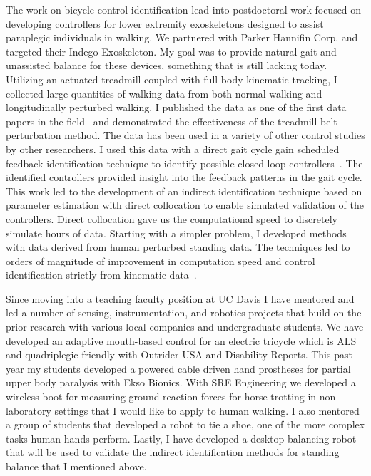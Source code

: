 \documentclass{article}
\begin{document}
The work on bicycle control identification lead into postdoctoral work focused
on developing controllers for lower extremity exoskeletons designed to assist
paraplegic individuals in walking. We partnered with Parker Hannifin Corp. and
targeted their Indego Exoskeleton. My goal was to provide natural gait and
unassisted balance for these devices, something that is still lacking today.
Utilizing an actuated treadmill coupled with full body kinematic tracking, I
collected large quantities of walking data from both normal walking and
longitudinally perturbed walking. I published the data as one of the first data
papers in the field~\cite{Moore2015b} and demonstrated the effectiveness of the
treadmill belt perturbation method. The data has been used in a variety of
other control studies by other researchers. I used this data with a direct gait
cycle gain scheduled feedback identification technique to identify possible
closed loop controllers~\cite{Moore2013c,Moore2014a,Moore2014c}. The identified
controllers provided insight into the feedback patterns in the gait cycle. This
work led to the development of an indirect identification technique based on
parameter estimation with direct collocation to enable simulated validation of
the controllers. Direct collocation gave us the computational speed to
discretely simulate hours of data. Starting with a simpler problem, I developed
methods with data derived from human perturbed standing data. The techniques
led to orders of magnitude of improvement in computation speed and control
identification strictly from kinematic data~\cite{Moore2014e,Moore2015}.

Since moving into a teaching faculty position at UC Davis I have mentored and
led a number of sensing, instrumentation, and robotics projects that build on
the prior research with various local companies and undergraduate students. We
have developed an adaptive mouth-based control for an electric tricycle which
is ALS and quadriplegic friendly with Outrider USA and Disability Reports. This
past year my students developed a powered cable driven hand prostheses for
partial upper body paralysis with Ekso Bionics. With SRE Engineering we
developed a wireless boot for measuring ground reaction forces for horse
trotting in non-laboratory settings that I would like to apply to human
walking. I also mentored a group of students that developed a robot to tie a
shoe, one of the more complex tasks human hands perform. Lastly, I have
developed a desktop balancing robot that will be used to validate the indirect
identification methods for standing balance that I mentioned above.
\end{document}
